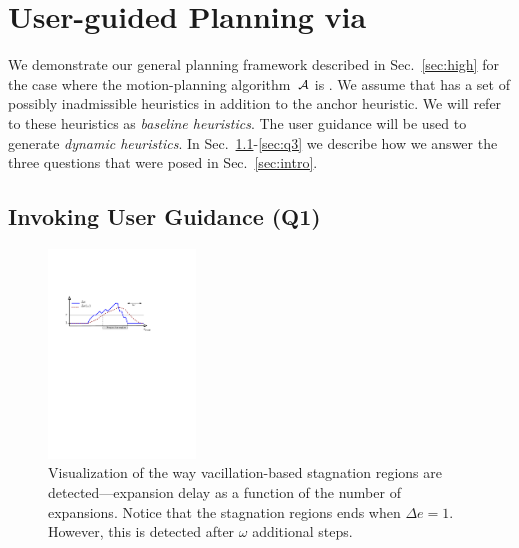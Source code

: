 \documentclass{article}
\begin{document}
\section{User-guided Planning via \mhastar}
\label{sec:planning}

We demonstrate our general planning framework described in Sec.~\ref{sec:high} for the case where the motion-planning algorithm~$\mathcal{A}$ is  \mhastar.
We assume that \mhastar has a set of possibly inadmissible heuristics in addition to the anchor heuristic. We will refer to these heuristics as \emph{baseline heuristics}.
The user guidance will be used to generate \emph{dynamic heuristics}.
In Sec.~\ref{sec:q1}-\ref{sec:q3} we describe how we answer the three questions that were posed in Sec.~\ref{sec:intro}.

\subsection{Invoking User Guidance (Q1)}
\label{sec:q1}

\begin{figure}
  \centering
  \includegraphics[width=0.35\textwidth]{fig/local_min_detection_new2.pdf}
	\vspace{-2mm}

  \caption{%
    Visualization of the way vacillation-based stagnation regions are detected---expansion delay as a function of the number of expansions.  
    Notice that the stagnation regions ends when $\Delta e = 1$.
    However, this is detected after $\omega$ additional steps.}

	\vspace{-1.5mm}
  \label{fig:filmstrip-local-min}%
\end{figure}
\end{document}

